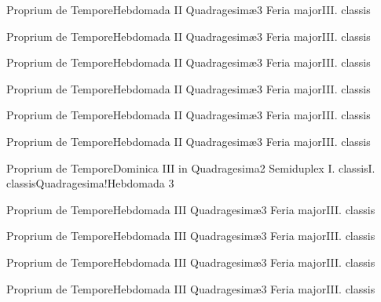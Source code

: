 \documentclass[liber-responsorialis_hiemalis.tex]{subfiles}
\begin{document}
	{Proprium de Tempore}{Hebdomada II Quadragesimæ}{3}{}
	{Feria major}{III. classis}{}
	{}
	{}

	{Proprium de Tempore}{Hebdomada II Quadragesimæ}{3}{}
	{Feria major}{III. classis}{}
	{}
	{}

	{Proprium de Tempore}{Hebdomada II Quadragesimæ}{3}{}
	{Feria major}{III. classis}{}
	{}
	{}

	{Proprium de Tempore}{Hebdomada II Quadragesimæ}{3}{}
	{Feria major}{III. classis}{}
	{}
	{}

	{Proprium de Tempore}{Hebdomada II Quadragesimæ}{3}{}
	{Feria major}{III. classis}{}
	{}
	{}

	{Proprium de Tempore}{Hebdomada II Quadragesimæ}{3}{}
	{Feria major}{III. classis}{}
	{}
	{}

	{Proprium de Tempore}{Dominica III in Quadragesima}{2}{}
	{Semiduplex I. classis}{I. classis}{Quadragesima!Hebdomada 3}
	{}
	{}

	{Proprium de Tempore}{Hebdomada III Quadragesimæ}{3}{}
	{Feria major}{III. classis}{}
	{}
	{}

	{Proprium de Tempore}{Hebdomada III Quadragesimæ}{3}{}
	{Feria major}{III. classis}{}
	{}
	{}

	{Proprium de Tempore}{Hebdomada III Quadragesimæ}{3}{}
	{Feria major}{III. classis}{}
	{}
	{}

	{Proprium de Tempore}{Hebdomada III Quadragesimæ}{3}{}
	{Feria major}{III. classis}{}
	{}
	{}
\end{document}
